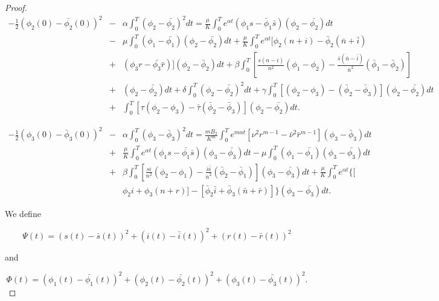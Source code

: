 \begin{proof}
\begin{eqnarray}
-\frac{1}{2}(\phi_2(0)-\bar{\phi_2}(0))^2&-&\alpha\int_{0}^{T}(\phi_2-\bar{\phi_2})^2dt=\frac{\mu}{K}\int_{0}^{T}e^{\alpha t}(\phi_1s-\bar{\phi}_1\bar{s})(\phi_2-\bar{\phi_2})dt\nonumber\\
&-&\mu\int_{0}^{T}(\phi_1-\bar{\phi_1})(\phi_2-\bar{\phi_2})dt+\frac{\mu}{K}\int_{0}^{T}e^{\alpha t}[\phi_2(n+i)-\bar{\phi}_2(\bar{n}+\bar{i}) \nonumber\\
&+& (\phi_3 r-\bar{\phi_3}\bar{r})](\phi_2-\bar{\phi}_2)dt+\beta\int_{0}^{T}\left[\frac{s(n-i)}{n^2}(\phi_1-\phi_2)-\frac{\bar{s}(\bar{n}-\bar{i})}{\bar{n}^2}(\bar{\phi}_1-\bar{\phi}_2)\right] \nonumber\\
&+&(\phi_2-\bar{\phi_2})dt+\delta\int_{0}^{T}(\phi_2-\bar{\phi_2})^2dt +\gamma\int_{0}^{T}[(\phi_2-\phi_3)-(\bar{\phi}_2-\bar{\phi}_3)](\phi_2-\bar{\phi_2})dt \nonumber\\
&+&\int_{0}^{T}[\tau(\phi_2-\phi_3)-\bar{\tau}(\bar{\phi}_2-\bar{\phi}_3)](\phi_2-\bar{\phi_2})dt. \label{eq.1.4.39}
\end{eqnarray}

\begin{eqnarray}
-\frac{1}{2}(\phi_3(0)-\bar{\phi}_3(0))^2&-&\alpha\int_{0}^{T}(\phi_3-\bar{\phi}_3)^2dt=\frac{m B_2}{K^m}\int_{0}^{T}e^{m\alpha t}[\nu^2r^{m-1}-\bar{\nu}^2\bar{r}^{m-1}](\phi_3-\bar{\phi}_3)dt\nonumber\\
&+&\frac{\mu}{K}\int_{0}^{T}e^{\alpha t}(\phi_1 s-\bar{\phi_1}\bar{s})(\phi_3-\bar{\phi_3})dt -\mu\int_{0}^{T}(\phi_1-\bar{\phi_1})(\phi_3-\bar{\phi_3})dt\nonumber\\
&+&\beta\int_{0}^{T}\left[\frac{s i}{n^2}(\phi_2-\phi_1)-\frac{\bar{s} \bar{i}}{\bar{n}^2}(\bar{\phi}_2-\bar{\phi}_1)\right](\phi_3-\bar{\phi_3})dt+\frac{\mu}{K}\int_{0}^{T}e^{\alpha t}\{[ \nonumber\\
&&\phi_2 i+\phi_3(n+r)]-[\bar{\phi}_2 \bar{i}+\bar{\phi}_3(\bar{n}+\bar{r})]\}(\phi_3-\bar{\phi_3})dt. \label{eq.1.4.40}
\end{eqnarray}

We define

\begin{equation*}
	\Psi(t)=(s(t)-\bar{s}(t))^2+(i(t)-\bar{i}(t))^2+(r(t)-\bar{r}(t))^2
\end{equation*}

and

\begin{equation*}
\Phi(t)=(\phi_1(t)-\bar{\phi_1}(t))^2+(\phi_2(t)-\bar{\phi_2}(t))^2+(\phi_3(t)-\bar{\phi_3}(t))^2.
\end{equation*}


\end{proof}
